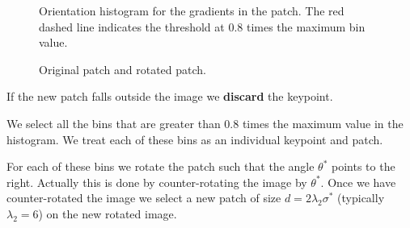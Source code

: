 \begin{figure}[H]
    \centering
    \caption{Orientation histogram for the gradients in the patch. The red dashed line indicates the threshold at 0.8 times the maximum bin value.}
    \label{fig:orientation_histogram}
\end{figure}

\begin{figure}[H]
    \centering
    \caption{Original patch and rotated patch.}
    \label{fig:rotated_patch}
\end{figure}

If the new patch falls outside the image we \textbf{discard} the keypoint.

We select all the bins that are greater than 0.8 times the maximum value in the histogram.
We treat each of these bins as an individual keypoint and patch.

For each of these bins we rotate the patch such that the angle $\theta^*$ points to
the right. Actually this is done by counter-rotating the image by $\theta^*$.
Once we have counter-rotated the image we select a new patch of size $d=2\lambda_2\sigma^*$
(typically $\lambda_2=6$) on the new rotated image.

